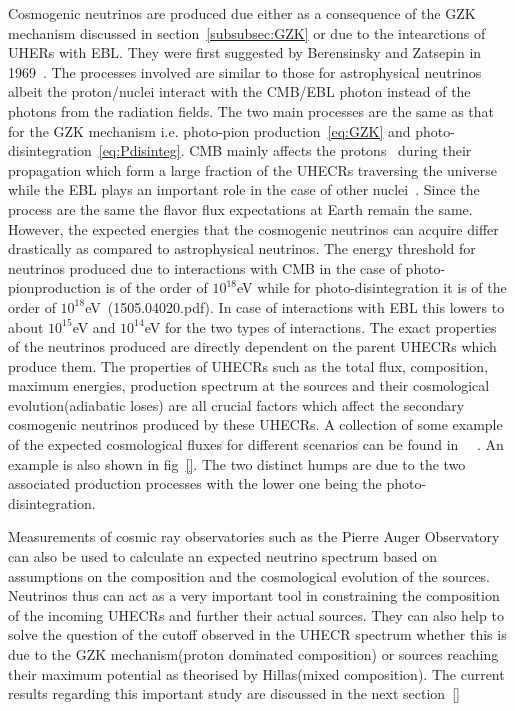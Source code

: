 Cosmogenic neutrinos are produced due either as a consequence of the GZK mechanism discussed in section~\ref{subsubsec:GZK} or due to the intearctions of UHERs with EBL. They were first suggested by Berensinsky and Zatsepin in 1969~\cite{}. The processes involved are similar to those for astrophysical neutrinos albeit the proton/nuclei interact with the CMB/EBL photon instead of the photons from the radiation fields. The two main processes are the same as that for the GZK mechanism i.e. photo-pion production~\ref{eq:GZK} and photo-disintegration~\ref{eq:Pdisinteg}. CMB mainly affects the protons~\cite{} during their propagation which form a large fraction of the UHECRs traversing the universe while the EBL plays an important role in the case of other nuclei~\cite{}. 
Since the process are the same the flavor flux expectations at Earth remain the same. However, the expected energies that the cosmogenic neutrinos can acquire differ drastically as compared to astrophysical neutrinos. The energy threshold for neutrinos produced due to interactions with CMB in the case of photo-pionproduction is of the order of $10^{18}$eV while for photo-disintegration it is of the order of $10^{18}$eV~\cite{}(1505.04020.pdf). In case of interactions with EBL this lowers to about $10^{15}$eV and $10^{14}$eV for the two types of interactions. 
The exact properties of the neutrinos produced are directly dependent on the parent UHECRs which produce them. The properties of UHECRs such as the total flux, composition, maximum energies, production spectrum at the sources and their cosmological evolution(adiabatic loses) are all crucial factors which affect the secondary cosmogenic neutrinos produced by these UHECRs. A collection of some example of the expected cosmological fluxes for different scenarios can be found in ~\cite{}~\cite{}. An example is also shown in fig~\ref{}. The two distinct humps are due to the two associated production processes with the lower one being the photo-disintegration. 

Measurements of cosmic ray observatories such as the Pierre Auger Observatory can also be used to calculate an expected neutrino spectrum based on assumptions on the composition and the cosmological evolution of the sources. Neutrinos thus can act as a very important tool in constraining the composition of the incoming UHECRs and further their actual sources. They can also help to solve the question of the cutoff observed in the UHECR spectrum whether this is due to the GZK mechanism(proton dominated composition) or sources reaching their maximum potential as theorised by Hillas(mixed composition). The current results regarding this important study are discussed in the next section~\ref{}


